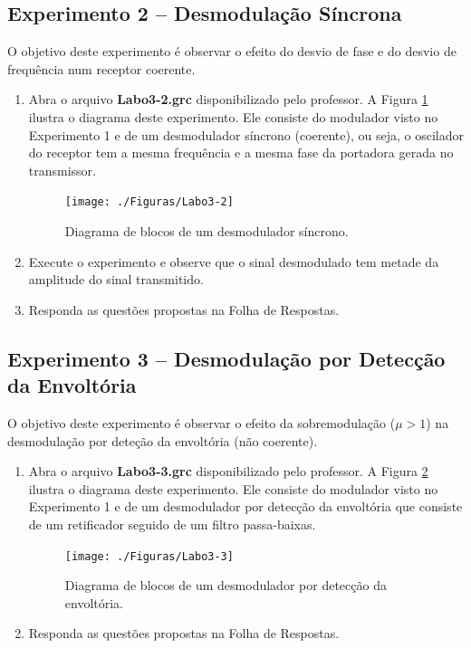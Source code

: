 \documentclass[12pt,addpoints]{exam}
\begin{document}
\subsection{Experimento 2 -- Desmodulação Síncrona}

O objetivo deste experimento é observar o efeito do desvio de fase e do desvio de frequência num receptor coerente.

\begin{enumerate}
    \item  Abra o arquivo \textbf{Labo3-2.grc} disponibilizado pelo professor. A Figura \ref{fig:GRC_3-1b} ilustra o diagrama deste experimento. Ele consiste do modulador visto no Experimento 1 e de um desmodulador síncrono (coerente), ou seja, o oscilador do receptor tem a mesma frequência e a mesma fase da portadora gerada no transmissor. 
    \begin{figure}[htb]
        \centering
        \texttt{[image: ./Figuras/Labo3-2]}
        \caption{Diagrama de blocos de um desmodulador síncrono.} 
        \label{fig:GRC_3-1b}
    \end{figure}
  \item Execute o experimento e observe que o sinal desmodulado tem metade da amplitude do sinal transmitido.
  \item Responda as questões propostas na Folha de Respostas.
\end{enumerate}

\subsection{Experimento 3 -- Desmodulação por Detecção da Envoltória}

O objetivo deste experimento é observar o efeito da sobremodulação ($\mu > 1$) na desmodulação por deteção da envoltória (não coerente).

\begin{enumerate}
    \item  Abra o arquivo \textbf{Labo3-3.grc} disponibilizado pelo professor. A Figura \ref{fig:GRC_3-1c} ilustra o diagrama deste experimento. Ele consiste do modulador visto no Experimento 1 e de um desmodulador por detecção da envoltória que consiste de um retificador seguido de um filtro passa-baixas.
    \begin{figure}[htb]
        \centering
        \texttt{[image: ./Figuras/Labo3-3]}
        \caption{Diagrama de blocos de um desmodulador por detecção da envoltória.} 
        \label{fig:GRC_3-1c}
    \end{figure}
  \item Responda as questões propostas na Folha de Respostas.
\end{enumerate}
\end{document}
